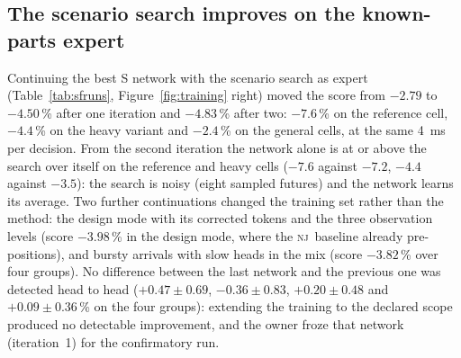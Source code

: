 \documentclass[11pt,a4paper]{article}
\theoremstyle{plain}
\theoremstyle{definition}
\theoremstyle{remark}
\newcommand{\nj}{\textsc{nj}}
\begin{document}
\subsection{The scenario search improves on the known-parts expert}\label{sec:sf}
Continuing the best S network with the scenario search as expert (Table~\ref{tab:sfruns},
Figure~\ref{fig:training} right) moved the score from $-2.79$ to $-4.50$\,\% after one
iteration and $-4.83$\,\% after two: $-7.6$\,\% on the reference cell, $-4.4$\,\% on the
heavy variant and $-2.4$\,\% on the general cells, at the same 4~ms per decision. From the
second iteration the network alone is at or above the search over itself on the reference
and heavy cells ($-7.6$ against $-7.2$, $-4.4$ against $-3.5$): the search is noisy (eight
sampled futures) and the network learns its average. Two further continuations changed the
training set rather than the method: the design mode with its corrected tokens and the
three observation levels (score $-3.98$\,\% in the design mode, where the \nj\ baseline
already pre-positions), and bursty arrivals with slow heads in the mix (score $-3.82$\,\%
over four groups). No difference between the last network and the previous one was detected head to
head ($+0.47\pm0.69$, $-0.36\pm0.83$, $+0.20\pm0.48$ and $+0.09\pm0.36$\,\% on the four
groups): extending the training to the declared scope produced no detectable improvement,
and the owner froze that network (iteration~1) for the confirmatory run.

\begin{table}[t]
\centering\small
\caption{Expert iteration with the scenario search, size S: per iteration, the network
alone on the validation groups (paired $\Delta$ vs \nj\ [\%, 95\,\% CI]), its score and
its expert's score. Bold iterations were accepted. The first run validates in the basic
mode; the two continuations in the design mode (where \nj\ also pre-positions), with the
fourth group added in the last. Legacy tie-break.}
\label{tab:sfruns}
\resizebox{\linewidth}{!}{}
\end{table}
\end{document}
